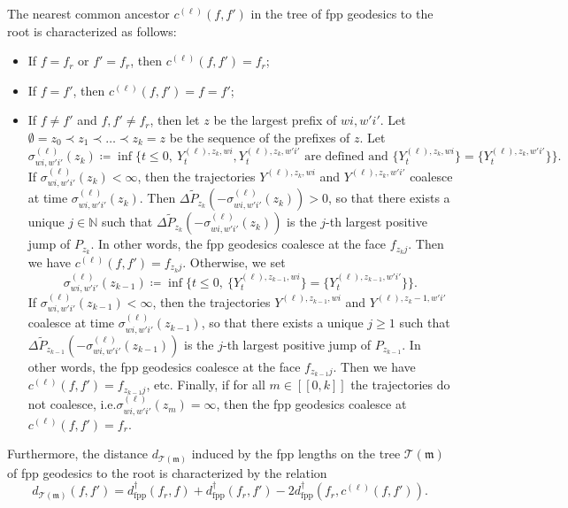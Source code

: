 \documentclass[11pt]{article}
\numberwithin{equation}{section}
\def \N{\mathbb{N}}
\def \T{\mathcal{T}}
\def\lb{[\![}
\def\rb{]\!]}
\begin{document}
The nearest common ancestor $c^{(\ell)}(f, f')$ in the tree of fpp geodesics to the root is characterized as follows:
\begin{itemize}
	\item If $f = f_r$ or $f'=f_r$, then $c^{(\ell)}(f,f')= f_r$;
	\item If $f=f'$, then $c^{(\ell)}(f,f')=f=f'$;
	\item If $f\neq f'$ and $f,f' \neq f_r$, then let $z$ be the largest prefix of $wi,w'i'$. Let $\emptyset = z_0 \prec z_1 \prec \ldots \prec z_k = z$ be the sequence of the prefixes of $z$. Let
	$$
	\sigma^{(\ell)}_{wi,w'i'}(z_k) \coloneqq \inf \{t \le 0 , \ Y^{(\ell), z_k, wi}_t ,Y^{(\ell), z_{k}, w'i'}_t \text{ are defined and } \{Y^{(\ell), z_k, wi}_t \} = \{Y^{(\ell), z_{k}, w'i'}_t\}\}.
	$$
	If $\sigma^{(\ell)}_{wi,w'i'}(z_k) <\infty$, then the trajectories $Y^{(\ell), z_{k}, wi}$ and $Y^{(\ell), z_{k}, w'i'}$ coalesce at time $\sigma^{(\ell)}_{wi,w'i'}(z_k)$. Then $\Delta \widetilde{P}_{z_k} (-\sigma^{(\ell)}_{wi,w'i'}(z_k))>0$, so that there exists a unique $j\in \N$ such that $\Delta \widetilde{P}_{z_k} (-\sigma^{(\ell)}_{wi,w'i'}(z_k))$ is the $j$-th largest positive jump of $P_{z_k}$. In other words, the fpp geodesics coalesce at the face $f_{z_k j}$. Then we have $c^{(\ell)}(f,f')= f_{z_k j}$. Otherwise, we set
	$$
	\sigma^{(\ell)}_{wi,w'i'}(z_{k-1}) \coloneqq \inf \{t \le 0 , \ \{Y^{(\ell), z_{k-1}, wi}_t \} = \{Y^{(\ell), z_{k-1}, w'i'}_t\}\}.
	$$
	If $\sigma^{(\ell)}_{wi,w'i'}(z_{k-1}) <\infty$, then the trajectories $Y^{(\ell), z_{k-1}, wi}$ and $Y^{(\ell), z_{k}-1, w'i'}$ coalesce at time $\sigma^{(\ell)}_{wi,w'i'}(z_{k-1}) $, so that there exists a unique $j \ge 1$ such that $\Delta \widetilde{P}_{z_{k-1}} (-\sigma^{(\ell)}_{wi,w'i'}(z_{k-1}))$ is the $j$-th largest positive jump of $P_{z_{k-1}}$. In other words, the fpp geodesics coalesce at the face $f_{z_{k-1} j}$. Then we have $c^{(\ell)}(f,f') = f_{z_{k-1}j}$, etc. Finally, if for all $m \in \lb 0,k \rb$ the trajectories do not coalesce, i.e.\@ $\sigma^{(\ell)}_{wi,w'i'}(z_m) = \infty$, then the fpp geodesics coalesce at $c^{(\ell)}(f,f')= f_r$.
\end{itemize}


Furthermore, the distance $d_{\T(\mathfrak{m})}$ induced by the fpp lengths on the tree $\T(\mathfrak{m})$ of fpp geodesics to the root is characterized by the relation
\begin{equation}\label{eq distance dans l arbre des geosesiques fpp}
d_{\T(\mathfrak{m})}(f,f') = d^\dagger_\mathrm{fpp}(f_r,f)+ d^\dagger_\mathrm{fpp}(f_r,f') - 2 d^\dagger_\mathrm{fpp}(f_r, c^{(\ell)}(f,f')).
\end{equation}
\end{document}
